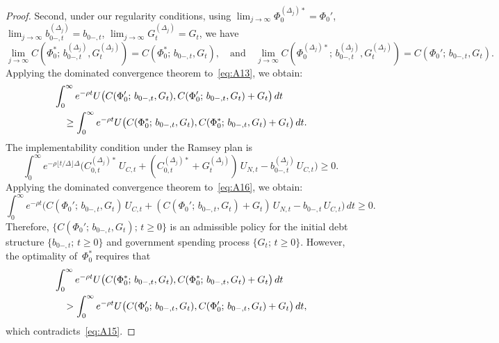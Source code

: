 \documentclass[12pt]{article}
\begin{document}
{{{\begin{proof}
Second, under our regularity conditions, using $\lim_{j \to \infty} \Phi_0^{(\Delta_j)*} = \Phi_0'$, $\lim_{j \to \infty} b_{0-,t}^{(\Delta_j)} = b_{0-,t}$, $\lim_{j \to \infty} G_t^{(\Delta_j)} = G_t$, we have
\[
\lim_{j \to \infty} C(\Phi_0^*;\, b_{0-,t}^{(\Delta_j)}, G_t^{(\Delta_j)}) = C(\Phi_0^*;\, b_{0-,t}, G_t), \quad \text{and} \quad \lim_{j \to \infty} C(\Phi_0^{(\Delta_j)*};\, b_{0-,t}^{(\Delta_j)}, G_t^{(\Delta_j)}) = C(\Phi_0';\, b_{0-,t}, G_t).
\]
Applying the dominated convergence theorem to~\eqref{eq:A13}, we obtain:
\begin{align}\label{eq:A15}
& \int_0^\infty e^{-\rho t} U\bigl(C(\Phi_0';\, b_{0-,t}, G_t), C(\Phi_0';\, b_{0-,t}, G_t)+G_t\bigr)\, dt \notag \\
& \quad \ge \int_0^\infty e^{-\rho t} U\bigl(C(\Phi_0^*;\, b_{0-,t}, G_t), C(\Phi_0^*;\, b_{0-,t}, G_t)+G_t\bigr)\, dt.
\end{align}
The implementability condition under the Ramsey plan is
\begin{equation}\label{eq:A16}
\int_0^\infty e^{-\rho \lfloor t/\Delta \rfloor \Delta}\bigl(C_{0,t}^{(\Delta_j)*}\, U_{C,t} + (C_{0,t}^{(\Delta_j)*}+G_t^{(\Delta_j)})\, U_{N,t} - b_{0-,t}^{(\Delta_j)}\, U_{C,t}\bigr) \ge 0.
\end{equation}
Applying the dominated convergence theorem to~\eqref{eq:A16}, we obtain:
\begin{equation}\label{eq:A17}
\int_0^\infty e^{-\rho t}\bigl(C(\Phi_0';\, b_{0-,t}, G_t)\, U_{C,t} + (C(\Phi_0';\, b_{0-,t}, G_t)+G_t)\, U_{N,t} - b_{0-,t}\, U_{C,t}\bigr)\, dt \ge 0.
\end{equation}
Therefore, $\{C(\Phi_0';\, b_{0-,t}, G_t);\, t \ge 0\}$ is an admissible policy for the initial debt structure $\{b_{0-,t};\, t \ge 0\}$ and government spending process $\{G_t;\, t \ge 0\}$. However, the optimality of~$\Phi_0^*$ requires that
\begin{align}\label{eq:A18}
& \int_0^\infty e^{-\rho t} U\bigl(C(\Phi_0^*;\, b_{0-,t}, G_t), C(\Phi_0^*;\, b_{0-,t}, G_t)+G_t\bigr)\, dt \notag \\
& \quad  > \int_0^\infty e^{-\rho t} U\bigl(C(\Phi_0';\, b_{0-,t}, G_t), C(\Phi_0';\, b_{0-,t}, G_t)+G_t\bigr)\, dt,
\end{align}
which contradicts~\eqref{eq:A15}. 
\end{proof} 




\newpage
\bigskip



}}}
\end{document}
